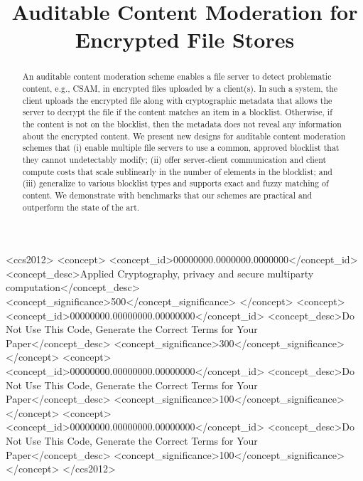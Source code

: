 \documentclass[sigconf]{acmart}
\begin{document}
\title{Auditable Content Moderation for Encrypted File Stores}



\begin{abstract}
An auditable content moderation scheme enables a file server to detect problematic content, e.g., CSAM, in encrypted files uploaded by a client(s). In such a system, the client uploads the encrypted file along with cryptographic metadata that allows the server to decrypt the file if the content matches an item in a blocklist. Otherwise, if the content is not on the blocklist, then the metadata does not reveal any information about the encrypted content.  We present new designs for auditable content moderation schemes that (i) enable multiple file servers to use a common, approved blocklist that they cannot undetectably modify; (ii) offer server-client communication and client compute costs that scale sublinearly in the number of elements in the blocklist; and (iii) generalize to various blocklist types and supports exact and fuzzy matching of content.  We demonstrate with benchmarks that our schemes are practical and outperform the state of the art. 
\end{abstract}



\begin{CCSXML}
<ccs2012>
 <concept>
  <concept_id>00000000.0000000.0000000</concept_id>
  <concept_desc>Applied Cryptography, privacy and secure multiparty computation</concept_desc>
  <concept_significance>500</concept_significance>
 </concept>
 <concept>
  <concept_id>00000000.00000000.00000000</concept_id>
  <concept_desc>Do Not Use This Code, Generate the Correct Terms for Your Paper</concept_desc>
  <concept_significance>300</concept_significance>
 </concept>
 <concept>
  <concept_id>00000000.00000000.00000000</concept_id>
  <concept_desc>Do Not Use This Code, Generate the Correct Terms for Your Paper</concept_desc>
  <concept_significance>100</concept_significance>
 </concept>
 <concept>
  <concept_id>00000000.00000000.00000000</concept_id>
  <concept_desc>Do Not Use This Code, Generate the Correct Terms for Your Paper</concept_desc>
  <concept_significance>100</concept_significance>
 </concept>
</ccs2012>
\end{CCSXML}

\end{document}
